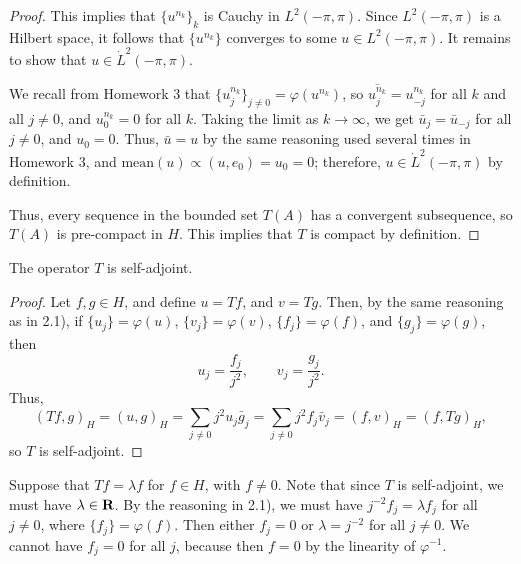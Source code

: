 \documentclass{homework}
\begin{document}
\begin{arabicparts}
\begin{proof}
			This implies that $\{u^{n_k}\}_k$ is Cauchy in $L^2(-\pi,\pi)$. Since $L^2(-\pi,\pi)$ is a Hilbert space, it follows that $\{u^{n_k}\}$ converges to some $u \in L^2(-\pi,\pi)$. It remains to show that $u \in \dot{L}^2(-\pi,\pi)$.
			
			We recall from Homework 3 that $\{u^{n_k}_j\}_{j\ne0} = \varphi(u^{n_k})$, so $\overline{u^{n_k}_j} = u^{n_k}_{-j}$ for all $k$ and all $j\ne0$, and $u^{n_k}_0 = 0$ for all $k$. Taking the limit as $k\to\infty$, we get $\bar{u}_j = \bar{u}_{-j}$ for all $j \ne 0$, and $u_0 = 0$. Thus, $\bar{u} = u$ by the same reasoning used several times in Homework 3, and $\mathrm{mean}(u)\propto (u,e_0)=u_0=0$; therefore, $u \in \dot{L}^2(-\pi,\pi)$ by definition.
			
			Thus, every sequence in the bounded set $T(A)$ has a convergent subsequence, so $T(A)$ is pre-compact in $H$. This implies that $T$ is compact by definition.
		\end{proof}
		
		\questionpart The operator $T$ is self-adjoint.
		\begin{proof}
			Let $f,g \in H$, and define $u = Tf$, and $v = Tg$. Then, by the same reasoning as in 2.1), if $\{u_j\} = \varphi(u)$, $\{v_j\} = \varphi(v)$, $\{f_j\} = \varphi(f)$, and $\{g_j\} = \varphi(g)$, then
			\begin{equation}
				u_j = \frac{f_j}{j^2}, \qquad v_j = \frac{g_j}{j^2}.
			\end{equation}
			Thus,
			\begin{equation}
				(Tf, g)_H = (u, g)_H = \sum_{j\ne0}j^2u_j\bar{g}_j = \sum_{j\ne0}j^2f_j\bar{v}_j = (f,v)_H = (f,Tg)_H,
			\end{equation}
			so $T$ is self-adjoint.
		\end{proof}
		
		\questionpart
		Suppose that $Tf = \lambda f$ for $f \in H$, with $f\ne0$. Note that since $T$ is self-adjoint, we must have $\lambda \in \textnormal{\bf R}$. By the reasoning in 2.1), we must have $j^{-2}f_j = \lambda f_j$ for all $j\ne0$, where $\{f_j\} = \varphi(f)$. Then either $f_j = 0$ or $\lambda = j^{-2}$ for all $j \ne 0$. We cannot have $f_j = 0$ for all $j$, because then $f = 0$ by the linearity of $\varphi^{-1}$.
		

\end{arabicparts}
\end{document}
